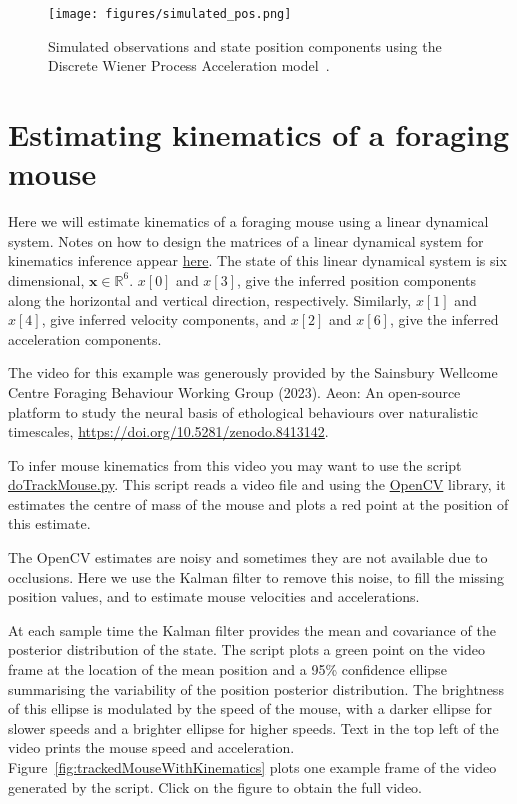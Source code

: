 \documentclass[12pt]{article}
\begin{document}
\begin{figure}[h]
	\begin{center}
		\texttt{[image: figures/simulated\_pos.png]}
		\label{fig:simulated_pos}
		\caption{Simulated observations and state position components
              using the Discrete Wiener Process Acceleration
              model~\citep[][Section 6.3.3]{barShalomEtAl04}.}
	\end{center}
\end{figure}

\section{Estimating kinematics of a foraging mouse}

Here we will estimate kinematics of a foraging mouse using a linear dynamical
system. Notes on how to design the matrices of a linear dynamical system for
kinematics inference appear
\href{https://github.com/joacorapela/lds_python/blob/master/docs/tracking/tracking.pdf}{here}.
The state of this linear dynamical system is six dimensional,
$\mathbf{x}\in\mathbb{R}^6$. $x[0]$ and $x[3]$, give the inferred
position components along the horizontal and vertical direction, respectively.
Similarly, $x[1]$ and $x[4]$, give inferred velocity components, and $x[2]$ and
$x[6]$, give the inferred acceleration components.

The video for this example was generously provided by the
Sainsbury Wellcome Centre Foraging Behaviour Working Group (2023). Aeon: An
open-source platform to study the neural basis of ethological behaviours over
naturalistic timescales, \url{https://doi.org/10.5281/zenodo.8413142}.

To infer mouse kinematics from this video you may want to use the script
\href{https://github.com/joacorapela/neuroinformatics24/blob/master/worksheets/07_linearDynamicalSystems/code/scripts/doTrackMouse.py}{doTrackMouse.py}.
This script reads a video file and using the \href{https://opencv.org/}{OpenCV}
library, it estimates the centre of mass
of the mouse and plots a red point at the position of this estimate.

The OpenCV estimates are noisy and sometimes they are not available due to occlusions.
Here we use the Kalman filter to remove this noise, to fill the
missing position values, and to estimate mouse velocities and accelerations.

At each sample time the Kalman filter provides the mean and covariance of the
posterior distribution of the state. The script plots a green point on the
video frame at the location of the mean position and a 95\% confidence ellipse
summarising the variability of the position posterior distribution. The
brightness of this ellipse is modulated by the speed of the mouse, with a
darker ellipse for slower speeds and a brighter ellipse for higher speeds. Text
in the top left of the video prints the mouse speed and acceleration.
Figure~\ref{fig:trackedMouseWithKinematics} plots one example frame of the
video generated by the script. Click on the figure to obtain the full video.
\end{document}
